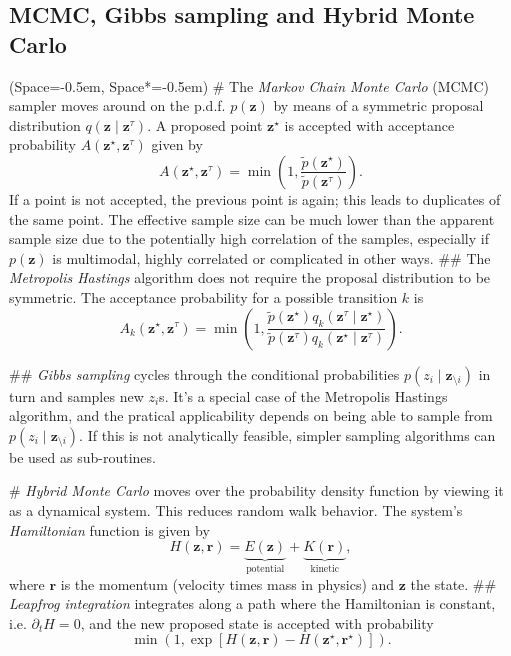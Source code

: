 \documentclass[12pt, a4paper]{article}
\newcommand{\listSpace}{-0.5em}%
\newcommand{\vect}[1]{\bm{#1}}
\begin{document}
\subsection*{MCMC, Gibbs sampling and Hybrid Monte Carlo}
\begin{easylist}[itemize]
	\ListProperties(Space=\listSpace, Space*=\listSpace)
	# The \emph{Markov Chain Monte Carlo} (MCMC) sampler moves around on the p.d.f. $p(\vect{z})$ by means of a symmetric proposal distribution $q(\vect{z} \mid \vect{z}^\tau)$.
	A proposed point $\vect{z}^\star$ is accepted with acceptance probability $A(\vect{z}^\star, \vect{z}^\tau)$ given by 
	\begin{equation*}
		A(\vect{z}^\star, \vect{z}^\tau)
		=
		\min 
		\left( 1,
		\frac{\widetilde{p}(\vect{z}^\star)}{\widetilde{p}(\vect{z}^\tau)}
		\right).
	\end{equation*}
	If a point is not accepted, the previous point is again; this leads to duplicates of the same point.
	The effective sample size can be much lower than the apparent sample size due to the potentially high correlation of the samples, especially if $p(\vect{z})$ is multimodal, highly correlated or complicated in other ways.
	## The \emph{Metropolis Hastings} algorithm does not require the proposal distribution to be symmetric.
	The acceptance probability for a possible transition $k$ is
		\begin{equation*}
		A_k(\vect{z}^\star, \vect{z}^\tau)
		=
		\min 
		\left( 1,
		\frac{\widetilde{p}(\vect{z}^\star) q_k(\vect{z}^\tau \mid \vect{z}^\star)}
		{\widetilde{p}(\vect{z}^\tau) q_k(\vect{z}^\star \mid \vect{z}^\tau)}
		\right).
		\end{equation*}
		
	## \emph{Gibbs sampling} cycles through the conditional probabilities $p(z_i \mid \vect{z}_{\setminus i})$ in turn and samples new $z_i$s.
	It's a special case of the Metropolis Hastings algorithm, and the pratical applicability depends on being able to sample from $p(z_i \mid \vect{z}_{\setminus i})$.
	If this is not analytically feasible, simpler sampling algorithms can be used as sub-routines.
	
	# \emph{Hybrid Monte Carlo} moves over the probability density function by viewing it as a dynamical system.
	This reduces random walk behavior.
	The system's \emph{Hamiltonian} function is given by
	\begin{equation*}
		H(\vect{z}, \vect{r}) = \underbrace{E(\vect{z})}_{\text{potential}} + \underbrace{K(\vect{r})}_{\text{kinetic}},
	\end{equation*}
	where $\vect{r}$ is the momentum (velocity times mass in physics) and $\vect{z}$ the state.
	## \emph{Leapfrog integration} integrates along a path where the Hamiltonian is constant, i.e. $\partial_t H = 0$, and the new proposed state is accepted with probability
	\begin{equation*}
		\min 
		\left( 1,
		\exp \left[ H(\vect{z}, \vect{r}) - H(\vect{z}^\star, \vect{r}^\star) \right]
		\right).
	\end{equation*}
\end{easylist}
\end{document}
